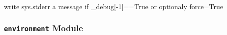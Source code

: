 \documentclass[a4paper,10pt,english]{sphinxmanual}
\begin{document}

\begin{fulllineitems}
\label{commands/apidoc/src:src.debug.write}
write sys.stderr a message if \_debug{[}-1{]}==True or optionaly force=True

\end{fulllineitems}



\subsubsection{\texttt{environment} Module}
\label{commands/apidoc/src:environment-module}\label{commands/apidoc/src:module-src.environment}
\end{document}
